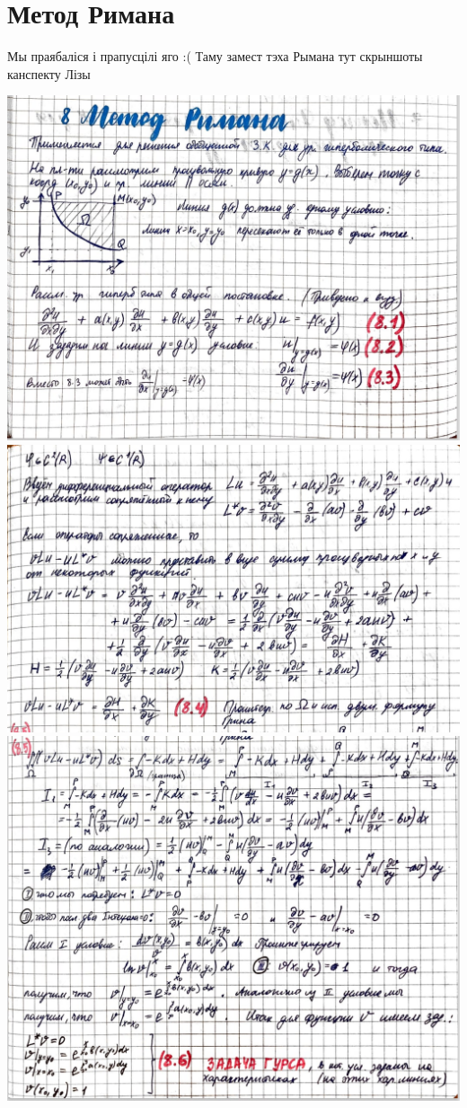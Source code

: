 \documentclass[../main.tex]{subfiles}
\begin{document}
\section{Метод Римана}

Мы праябаліся і прапусцілі яго :( Таму замест тэха Рымана тут скрыншоты канспекту Лізы

\includegraphics[scale=0.7]{Liza_2.7.1.jpg}
\includegraphics[scale=0.7]{Liza_2.7.2.jpg}
\includegraphics[scale=0.7]{Liza_2.7.3.jpg}
\end{document}
